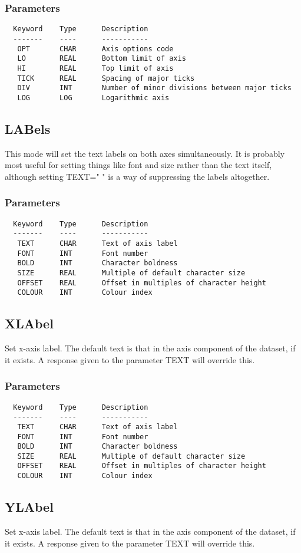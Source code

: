 \documentclass{book}
\renewcommand{\_}{{\tt\char'137}}     %
\begin{document}
\subsubsection{Parameters}
\begin{verbatim}
  Keyword    Type      Description
  -------    ----      -----------
   OPT       CHAR      Axis options code
   LO        REAL      Bottom limit of axis
   HI        REAL      Top limit of axis
   TICK      REAL      Spacing of major ticks
   DIV       INT       Number of minor divisions between major ticks
   LOG       LOG       Logarithmic axis
\end{verbatim}\subsection{LABels}
This mode will set the text labels on both axes simultaneously.
It is probably most useful for setting things like font and size
rather than the text itself, although setting TEXT=" " is a way
of suppressing the labels altogether.

\subsubsection{Parameters}
\begin{verbatim}
  Keyword    Type      Description
  -------    ----      -----------
   TEXT      CHAR      Text of axis label
   FONT      INT       Font number
   BOLD      INT       Character boldness
   SIZE      REAL      Multiple of default character size
   OFFSET    REAL      Offset in multiples of character height
   COLOUR    INT       Colour index
\end{verbatim}\subsection{XLAbel}
Set x-axis label. The default text is that in the axis component
of the dataset, if it exists. A response given to the parameter
TEXT will override this.

\subsubsection{Parameters}
\begin{verbatim}
  Keyword    Type      Description
  -------    ----      -----------
   TEXT      CHAR      Text of axis label
   FONT      INT       Font number
   BOLD      INT       Character boldness
   SIZE      REAL      Multiple of default character size
   OFFSET    REAL      Offset in multiples of character height
   COLOUR    INT       Colour index
\end{verbatim}\subsection{YLAbel}
Set x-axis label. The default text is that in the axis component
of the dataset, if it exists. A response given to the parameter
TEXT will override this.
\end{document}
